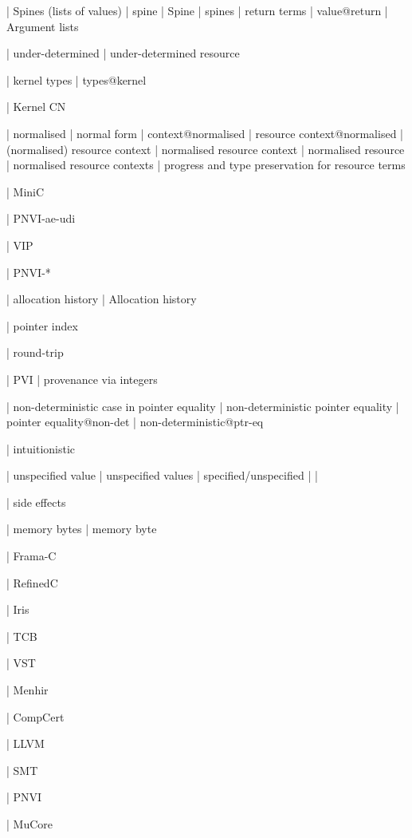 | Spines (lists of values)
 | spine
 | Spine
 | spines
 | return terms
 | value@return
 | Argument lists


 | under-determined
 | under-determined resource

 | kernel types
 | types@kernel

 | Kernel CN

 | normalised
 | normal form
 | context@normalised
 | resource context@normalised
 | (normalised) resource context
 | normalised resource context
 | normalised resource
 | normalised resource contexts
 | progress and type preservation for resource terms

 | MiniC


 | PNVI-ae-udi

 | VIP

 | PNVI-*

 | allocation history
 | Allocation history

 | pointer index

 | round-trip

 | PVI
 | provenance via integers

 | non-deterministic case in pointer equality
 | non-deterministic pointer equality
 | pointer equality@non-det
 | non-deterministic@ptr-eq

 | intuitionistic

 | unspecified value
 | unspecified values
 | specified/unspecified
 | 
 | 

 | side effects

 | memory bytes
 | memory byte

 | Frama-C

 | RefinedC

 | Iris

 | TCB

 | VST

 | Menhir

 | CompCert

 | LLVM

 | SMT

 | PNVI

 | MuCore
